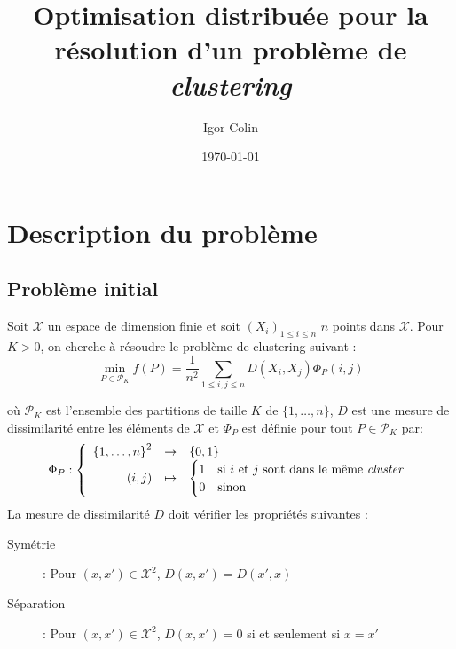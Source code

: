 \documentclass[a4paper]{article}
\title{Optimisation distribuée pour la résolution d'un problème
    de \emph{clustering}}
\author{Igor Colin}
\date{\today}
\begin{document}
\maketitle

\section{Description du problème}
\label{sec:description_probleme}

\subsection{Problème initial}
\label{sub:probleme_initial}

Soit $\mathcal{X}$ un espace de dimension finie et soit
$(X_i)_{1 \leq i \leq n}$ $n$ points dans $\mathcal{X}$. Pour $K > 0$,
on cherche à résoudre le problème de clustering suivant
\cite{clemenccon2014statistical}:
\begin{equation}
    \label{eq:clustering_initial}
    \min_{P \in \mathcal{P}_K} f(P) =
    \frac{1}{n^2} \sum_{1 \leq i,j \leq n} D(X_i, X_j) \Phi_P(i, j)
\end{equation}

où $\mathcal{P}_K$ est l'ensemble des partitions de taille $K$ de
$\{1,\ldots,n\}$, $D$ est une mesure de dissimilarité entre les éléments de
$\mathcal{X}$ et $\Phi_P$ est définie pour tout $P \in \mathcal{P}_K$ par:
\[
    \Phi_P : \left\{
        \begin{array}{r c l}
            \left\{ 1,\ldots,n \right\}^2 & \rightarrow & \left\{ 0, 1 \right\}\\
            (i, j) & \mapsto &
            \begin{cases}
                1 & \text{si } i \text{ et } j \text{ sont dans le même \emph{cluster}} \\
                0 & \text{sinon}
            \end{cases}
        \end{array}
    \right.
\]
La mesure de dissimilarité $D$ doit vérifier les propriétés suivantes :
\begin{description}
    \item[Symétrie] : Pour $(x, x') \in \mathcal{X}^2$, $D(x, x') = D(x', x)$
    \item[Séparation] : Pour $(x, x') \in \mathcal{X}^2$, $D(x, x') = 0$
        si et seulement si $x = x'$
\end{description}
\end{document}
